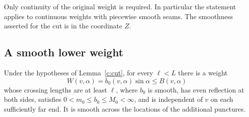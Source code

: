 Only continuity of the original weight is required.  In particular the
statement applies to continuous weights with piecewise smooth seams.  The
smoothness asserted for the cut is in the coordinate $Z$.

\subsection{A smooth lower weight}

\begin{lemma}\label{c:lower-weight}
Under the hypotheses of Lemma~\ref{c:cut}, for every $\ell<L$ there is a
weight
\[
 W(v,\alpha)=b_0(v,\alpha)\sin\alpha\le B(v,\alpha)
\]
whose crossing lengths are at least $\ell$, where $b_0$ is smooth, has even
reflection at both sides, satisfies
$0<m_0\le b_0\le M_0<\infty$, and is independent of $v$ on each sufficiently
far end.  It is smooth across the locations of the additional punctures.
\end{lemma}

